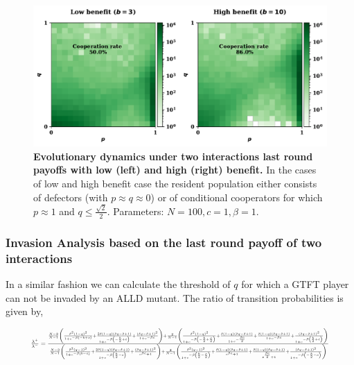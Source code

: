 \documentclass[11pt]{article}
\theoremstyle{plainCl1}
\theoremstyle{plainCl2}
\begin{document}
\begin{figure}[!htbp]
  \centering 
  \includegraphics[width=.70\textwidth]{static/two_interactions_donation_game.pdf}
  \caption{\textbf{Evolutionary dynamics under two interactions last round
  payoffs with low (left) and high (right) benefit.} In the cases of low and
  high benefit case the resident population either consists of defectors (with
  \(p \approx q \approx 0\)) or of conditional cooperators for which \(p \approx
  1\) and \(q \leq \frac{\sqrt{2}}{2}\). Parameters: \(N =100, c=1, \beta=1\).
  }\label{fig:two_interactions_results}
\end{figure}

\subsubsection*{Invasion Analysis based on the last round payoff of two interactions}

In a similar fashion we can calculate the threshold of \(q\) for which a GTFT
player can not be invaded by an ALLD mutant. The ratio of transition probabilities
is given by,

\begin{equation}
  \resizebox{.9\textwidth}{!}
  {%
$\frac{\lambda^{+}}{\lambda^{-}} =
\frac{\frac{N - 3}{N-1} \left(\frac{\delta^{2} \left(1 - q\right)^{2}}{1 + e^{- \beta \left(- b + c\right)}} + \frac{2 \delta \left(1 - q\right) \left(\delta q - \delta + 1\right)}{1 + e^{- \beta \left(- \frac{b}{2} + c\right)}} + \frac{\left(\delta q - \delta + 1\right)^{2}}{1 + e^{- \beta c}}\right) 
+ \frac{2}{N-1} \left(\frac{\delta^{2} \left(1 - q\right)^{2}}{1 + e^{- \beta \left(- \frac{b}{2} + \frac{c}{2}\right)}} + \frac{\delta \left(1 - q\right) \left(\delta q - \delta + 1\right)}{1 + e^{- \frac{\beta c}{2}}} + \frac{\delta \left(1 - q\right) \left(\delta q - \delta + 1\right)}{1 + e^{- \beta c}} + \frac{\left(\delta q - \delta + 1\right)^{2}}{1 + e^{- \beta \left(\frac{b}{2} + c\right)}}\right)}
{\frac{N - 3}{N-1} \left(\frac{\delta^{2} \left(q - 1\right)^{2}}{1 + e^{- \beta \left(b - c\right)}} + \frac{2 \delta \left(1 - q\right) \left(\delta q - \delta + 1\right)}{1 + e^{- \beta \left(\frac{b}{2} - c\right)}} + \frac{\left(\delta q - \delta + 1\right)^{2}}{e^{\beta c} + 1}\right) + \frac{2}{N-1} \left(\frac{\delta^{2} \left(q - 1\right)^{2}}{1 + e^{- \beta \left(\frac{b}{2} - \frac{c}{2}\right)}} + \frac{\delta \left(1 - q\right) \left(\delta q - \delta + 1\right)}{e^{\beta c} + 1} + \frac{\delta \left(1 - q\right) \left(\delta q - \delta + 1\right)}{e^{\frac{\beta c}{2}} + 1} + \frac{\left(\delta q - \delta + 1\right)^{2}}{1 + e^{- \beta \left(- \frac{b}{2} - c\right)}}\right)}
$}
\end{equation}
\end{document}
